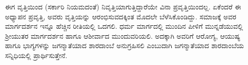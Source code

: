 {ಈಗ ವೃತ್ತಿಯಿಂದ (ಸರ್ಕಾರಿ ನಿಯಮದಂತೆ) ನಿವೃತ್ತಿಯಾಗುತ್ತಿದ್ದಾರೆಯೇ ವಿನಾ ಪ್ರವೃತ್ತಿಯಿಂದಲ್ಲ. ಏಕೆಂದರೆ ಈ ಅಧ್ಯಾಪನ ಪ್ರವೃತ್ತಿ, ಅವರು ವೃತ್ತಿಯನ್ನು ಆರಂಭಿಸುವದಕ್ಕಿಂತ ಮೊದಲೇ ಬೆಳೆಸಿಕೊಂಡಿದ್ದು. ಸಮಾಜಕ್ಕೆ ಅವರ ಮಾರ್ಗದರ್ಶನ ಇನ್ನೂ ಹೆಚ್ಚಿನ ರೀತಿಯಲ್ಲಿ ಒದಗಲಿ. ಧರ್ಮ ಮಾರ್ಗದಲ್ಲಿ ಮುಂದಿನ ಪೀಳಿಗೆ ಮುನ್ನಡೆಯುವಲ್ಲಿ ಶ್ರೀಯುತರ ಮಾರ್ಗದರ್ಶನ ಹಾಗೂ ಆಶೀರ್ವಾದ ಮುಂದುವರಿಯಲಿ. ಅದಕ್ಕಾಗಿ ಅವರಿಗೆ ಆರೋಗ್ಯ, ಆಯುಷ್ಯ ಹಾಗೂ ಭಾಗ್ಯಗಳನ್ನು ಜಗನ್ಮಾತೆಯಾದ ಶಾರದಾಂಬೆ ಅನುಗ್ರಹಿಸಲಿ ಎಂಬುದಾಗಿ ಜಗನ್ಮಾತೆಯಾದ ಶಾರದಾಂಬೆಯ ಸನ್ನಿಧಿಯಲ್ಲಿ ಪ್ರಾರ್ಥಿಸುತ್ತೇನೆ.

\articleend
}
